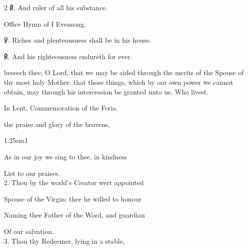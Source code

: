 \begin{paracol}{2}
	℟. And ruler of all his substance.
	

\secondEvensong
{}

\begin{rubric}
	Office Hymn of I Evensong.
\end{rubric}

    ℣. Riches and plenteousness shall be in his house.

	℟. And his righteousness endureth for ever.
	
	
\collect
{} beseech thee, O Lord, that we may be aided through the merits of the Spouse of thy most holy Mother: that those things, which by our own power we cannot obtain, may through his intercession be granted unto us. Who livest.

\begin{rubric}
    In Lent, Commemoration of the Feria.
\end{rubric}
	
	\switchcolumn
	
\mattins
{}
	
	\mattinsInvitatoryHymn\label{JosephInvitatory}
	
 the praise and glory of the heavens,

\begin{hangparas}{1.25em}{1}

As in our joy we sing to thee, in kindness

List to our praises.\\

2. Thou by the world’s Creator wert appointed

Spouse of the Virgin: thee he willed to honour

Naming thee Father of the Word, and guardian

Of our salvation.\\

3. Thou thy Redeemer, lying in a stable,


\end{hangparas}
\end{paracol}
